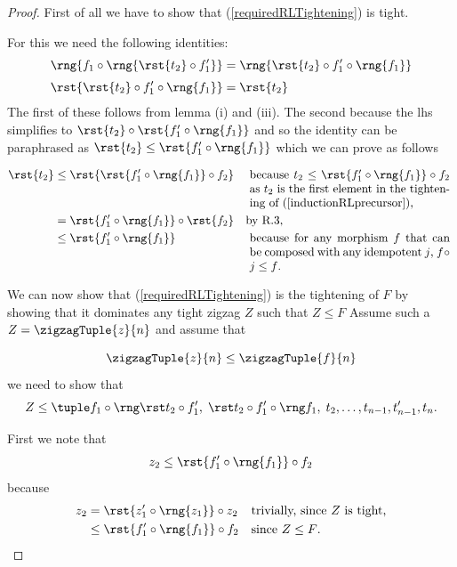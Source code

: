 \begin{proof}
First of all we have to show that (\ref{requiredRLTightening}) is tight. 

For this we need the following identities:
\begin{align}
\label{RLtightnessIdentityOne}
\rng{f_1 \circ \rng{\rst{t_2} \circ f'_1}}&=\rng{\rst{t_2} \circ f'_1 \circ \rng{f_1}}   \\[0.1cm]
\label{RLtightnessIdentityTwo}
\rst{\rst{t_2} \circ f'_1 \circ \rng{f_1}}&=\rst{t_2}
\end{align}
The first of these follows from lemma  (i) and (iii).
The second because the lhs simplifies to 
$\rst{t_2} \circ \rst{f'_1 \circ \rng{f_1}}$
and so the identity can be paraphrased as 
$\rst{t_2} \leq \rst{f'_1 \circ \rng{f_1}}$ 
which we can prove as follows 

\newcommand{\stepOneReason}{
\parbox[t]{6cm}{because $t_2 \leq \rst{f'_1 \circ \rng{f_1}} \circ f_2$
as $t_2$ is the first element in the tightening of (\ref{inductionRLprecursor}),
}
}
\newcommand{\stepThreeReason}{
\parbox[t]{6cm}{because for any morphism $f$ 
                that can be composed with any idempotent $j$,
                    $f \circ j \leq f$.
}
}
\begin{align*}
\rst{t_2} &\leq \rst{\rst{f'_1 \circ \rng{f_1}} \circ f_2}
                && \mbox{\stepOneReason} \\
          &= \rst{f'_1 \circ \rng{f_1}} \circ \rst{f_2} 
                && \mbox{by R.3,} \\
          &\leq \rst{f'_1 \circ \rng{f_1}}
                && \mbox{\stepThreeReason}
\end{align*}

We can now show that (\ref{requiredRLTightening})
is the tightening of $F$ by showing that 
it dominates any tight zigzag $Z$ such that
$Z \leq F$ 
Assume such a $Z=\zigzagTuple{z}{n}$ and assume that

\[
\zigzagTuple{z}{n} \leq \zigzagTuple{f}{n}
\]
we need to show that 
\begin{equation}
\label{targetRLInequality}
Z \leq \rightToLeftTightening.
\end{equation}

First we note that  
\[
 z_2 \leq \rst{f'_1 \circ \rng{f_1}} \circ f_2
\]
because 
\begin{align*}
z_2 &= \rst{z'_1 \circ \rng{z_1}} \circ z_2 
          && \mbox{trivially, since $Z$ is tight,}\\
    &\leq \rst{f'_1 \circ \rng{f_1}} \circ f_2 
     &&\mbox{\parbox{3cm}{since $Z \leq F$.}}
\end{align*}


\end{proof}
